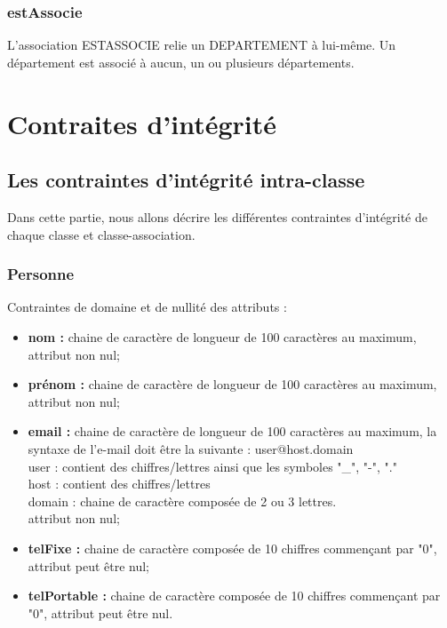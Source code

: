 \documentclass[asi, sansVersion]{picInsa}
\begin{document}
\subsection*{estAssocie}

L'association ESTASSOCIE relie un DEPARTEMENT à lui-même. Un département est associé à aucun, un ou plusieurs départements.

\chapter{Contraites d'intégrité}

\section{Les contraintes d'intégrité intra-classe}
Dans cette partie, nous allons décrire les différentes contraintes d'intégrité de chaque classe et classe-association.
 
\subsection*{Personne}
Contraintes de domaine et de nullité des attributs :
\begin{itemize}
 	\item \textbf{nom :} chaine de caractère de longueur de 100 caractères au maximum, attribut non nul;
	\item \textbf{prénom :} chaine de caractère de longueur de 100 caractères au maximum, attribut non nul;
	\item \textbf{email :} chaine de caractère de longueur de 100 caractères au maximum, la syntaxe de l'e-mail doit être la suivante : user@host.domain\\
	user : contient des chiffres/lettres ainsi que les symboles "\_", "-", "." \\
	host : contient des chiffres/lettres \\
	domain : chaine de caractère composée de 2 ou 3 lettres. \\
	attribut non nul;  
	\item \textbf{telFixe :} chaine de caractère composée de 10 chiffres commençant par "0", attribut peut être nul;
	\item \textbf{telPortable :} chaine de caractère composée de 10 chiffres commençant par "0", attribut peut être nul.\\
\end{itemize}  
\end{document}
